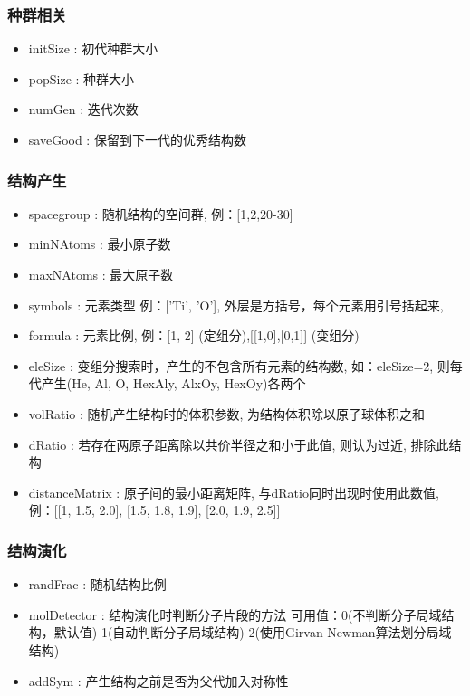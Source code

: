 \documentclass[12pt]{article}
\begin{document}
\subsubsection{种群相关}
\begin{itemize}
    \item initSize          : 初代种群大小
    \item popSize           : 种群大小
    \item numGen            : 迭代次数
    \item saveGood          : 保留到下一代的优秀结构数
\end{itemize}

\subsubsection{结构产生}
\begin{itemize}
    \item spacegroup        : 随机结构的空间群, 
    例：[1,2,20-30]
    \item minNAtoms         : 最小原子数
    \item maxNAtoms         : 最大原子数
    \item symbols           : 元素类型
    例：['Ti', 'O'], 外层是方括号，每个元素用引号括起来, 
    \item formula           : 元素比例, 
    例：[1, 2] (定组分),[[1,0],[0,1]] (变组分)
    \item eleSize           : 变组分搜索时，产生的不包含所有元素的结构数, 
    如：eleSize=2, 则每代产生(He, Al, O, HexAly, AlxOy, HexOy)各两个
    \item volRatio          : 随机产生结构时的体积参数, 为结构体积除以原子球体积之和
    \item dRatio            : 若存在两原子距离除以共价半径之和小于此值, 则认为过近, 排除此结构
    \item distanceMatrix    : 原子间的最小距离矩阵, 与dRatio同时出现时使用此数值, 
    例：[[1, 1.5, 2.0], [1.5, 1.8, 1.9], [2.0, 1.9, 2.5]]
\end{itemize}

\subsubsection{结构演化}
\begin{itemize}
    \item randFrac          : 随机结构比例
    \item molDetector       : 结构演化时判断分子片段的方法
    可用值：0(不判断分子局域结构，默认值)  1(自动判断分子局域结构)  2(使用Girvan-Newman算法划分局域结构)
    \item addSym            : 产生结构之前是否为父代加入对称性
\end{itemize} 
\end{document}
